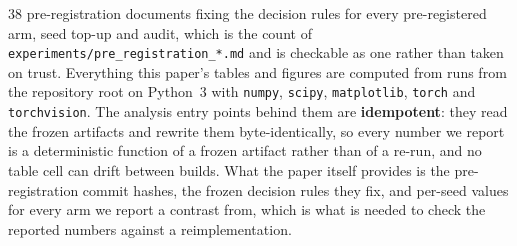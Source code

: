 \documentclass{article}
\begin{document}
$38$ pre-registration documents fixing the decision rules for every pre-registered arm, seed
top-up and audit, which is the count of \texttt{experiments/\allowbreak pre\_registration\_*.md}
and is checkable as one rather than taken on trust.
Everything this paper's tables and figures are computed from runs from the repository root on
Python~3 with \texttt{numpy}, \texttt{scipy}, \texttt{matplotlib}, \texttt{torch} and
\texttt{torchvision}. The analysis entry points behind them are \textbf{idempotent}:
they read the frozen artifacts and rewrite them byte-identically, so every number we report is
a deterministic function of a frozen artifact rather than of a re-run, and no table cell can
drift between builds. What the paper itself provides is the pre-registration commit hashes,
the frozen decision rules they fix, and per-seed values for every arm we report a contrast from, which
is what is needed to check the reported numbers against a reimplementation.
\end{document}
